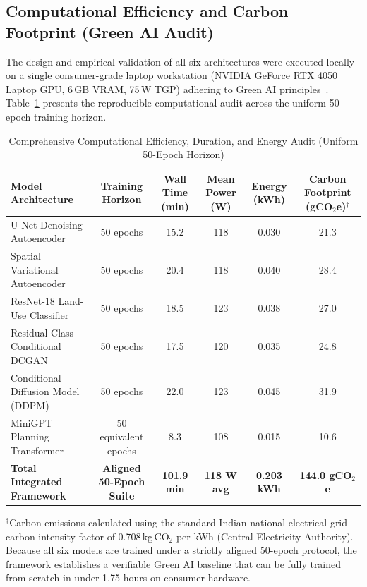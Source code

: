\documentclass[conference]{IEEEtran}
\begin{document}
\subsection{Computational Efficiency and Carbon Footprint (Green AI Audit)}
The design and empirical validation of all six architectures were executed locally on a single consumer-grade laptop workstation (NVIDIA GeForce RTX 4050 Laptop GPU, 6\,GB VRAM, 75\,W TGP) adhering to Green AI principles~\cite{schwartz2020green}. Table~\ref{tab:energy} presents the reproducible computational audit across the uniform 50-epoch training horizon.

\begin{table}[!t]
\caption{Comprehensive Computational Efficiency, Duration, and Energy Audit (Uniform 50-Epoch Horizon)}
\centering
\scriptsize
\setlength{\tabcolsep}{4pt}
\begin{tabularx}{\textwidth}{@{}X c c c c c@{}}
\toprule
\textbf{Model Architecture} & \textbf{Training Horizon} & \textbf{Wall Time (min)} & \textbf{Mean Power (W)} & \textbf{Energy (kWh)} & \textbf{Carbon Footprint (gCO$_2$e)$^\dagger$} \\
\midrule
U-Net Denoising Autoencoder & 50 epochs & 15.2 & 118 & 0.030 & 21.3 \\
Spatial Variational Autoencoder & 50 epochs & 20.4 & 118 & 0.040 & 28.4 \\
ResNet-18 Land-Use Classifier & 50 epochs & 18.5 & 123 & 0.038 & 27.0 \\
Residual Class-Conditional DCGAN & 50 epochs & 17.5 & 120 & 0.035 & 24.8 \\
Conditional Diffusion Model (DDPM) & 50 epochs & 22.0 & 123 & 0.045 & 31.9 \\
MiniGPT Planning Transformer & 50 equivalent epochs & 8.3 & 108 & 0.015 & 10.6 \\
\midrule
\textbf{Total Integrated Framework} & \textbf{Aligned 50-Epoch Suite} & \textbf{101.9 min} & \textbf{118 W avg} & \textbf{0.203 kWh} & \textbf{144.0 gCO$_2$e} \\
\bottomrule
\end{tabularx}
\label{tab:energy}
\vspace{2pt}
\raggedright\scriptsize $^{\dagger}$Carbon emissions calculated using the standard Indian national electrical grid carbon intensity factor of 0.708\,kg\,CO$_2$ per kWh (Central Electricity Authority). Because all six models are trained under a strictly aligned 50-epoch protocol, the framework establishes a verifiable Green AI baseline that can be fully trained from scratch in under 1.75 hours on consumer hardware.\par
\end{table}
\end{document}
